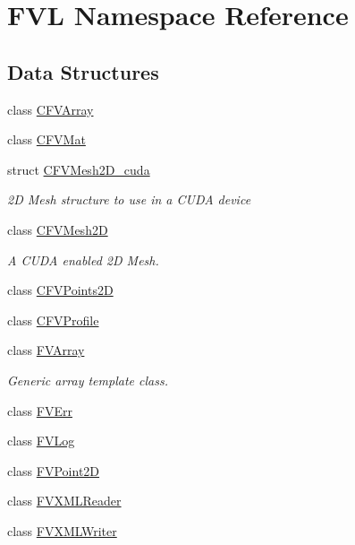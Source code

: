 \hypertarget{namespaceFVL}{
\section{FVL Namespace Reference}
\label{dd/d11/namespaceFVL}
}
\subsection*{Data Structures}
\begin{DoxyCompactItemize}
\item 
class \hyperlink{classFVL_1_1CFVArray}{CFVArray}
\item 
class \hyperlink{classFVL_1_1CFVMat}{CFVMat}
\item 
struct \hyperlink{structFVL_1_1CFVMesh2D__cuda}{CFVMesh2D\_\-cuda}
\begin{DoxyCompactList}\small\item\em 2D Mesh structure to use in a CUDA device \item\end{DoxyCompactList}\item 
class \hyperlink{classFVL_1_1CFVMesh2D}{CFVMesh2D}
\begin{DoxyCompactList}\small\item\em A CUDA enabled 2D Mesh. \item\end{DoxyCompactList}\item 
class \hyperlink{classFVL_1_1CFVPoints2D}{CFVPoints2D}
\item 
class \hyperlink{classFVL_1_1CFVProfile}{CFVProfile}
\item 
class \hyperlink{classFVL_1_1FVArray}{FVArray}
\begin{DoxyCompactList}\small\item\em Generic array template class. \item\end{DoxyCompactList}\item 
class \hyperlink{classFVL_1_1FVErr}{FVErr}
\item 
class \hyperlink{classFVL_1_1FVLog}{FVLog}
\item 
class \hyperlink{classFVL_1_1FVPoint2D}{FVPoint2D}
\item 
class \hyperlink{classFVL_1_1FVXMLReader}{FVXMLReader}
\item 
class \hyperlink{classFVL_1_1FVXMLWriter}{FVXMLWriter}
\end{DoxyCompactItemize}
